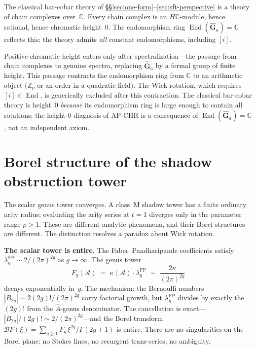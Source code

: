 \documentclass[11pt]{article}
\newcommand{\cA}{\mathcal{A}}
\newcommand{\C}{\mathbb{C}}
\newcommand{\Z}{\mathbb{Z}}
\newcommand{\End}{\operatorname{End}}
\begin{document}
\begin{observation}
\label{obs:wick-rational}
The classical bar-cobar theory of
\S\S\ref{sec:one-form}--\ref{sec:sft-perspective} is a theory of
chain complexes over~$\C$.  Every chain complex is an
$H\C$-module, hence rational, hence chromatic height~$0$.  The
endomorphism ring $\End(\hat{\mathbf{G}}_a) = \C$ reflects this:
the theory admits \emph{all} constant endomorphisms, including
$[i]$.

Positive chromatic height enters only after spectralization---the
passage from chain complexes to genuine spectra, replacing
$\hat{\mathbf{G}}_a$ by a formal group of finite height.  This
passage contracts the endomorphism ring from $\C$ to an arithmetic
object ($\Z_p$ or an order in a quadratic field).  The Wick
rotation, which requires $[i] \in \End$, is generically excluded
after this contraction.  The classical bar-cobar theory is
height~$0$ \emph{because} its endomorphism ring is large enough to
contain all rotations; the height-$0$ diagnosis of AP-CHR is a
consequence of $\End(\hat{\mathbf{G}}_a) = \C$, not an independent
axiom.
\end{observation}

\section{Borel structure of the shadow obstruction tower}
\label{sec:borel-structure-shadow}

The scalar genus tower converges.  A class~M shadow tower has a
finite ordinary arity radius; evaluating the arity series at
$t=1$ diverges only in the parameter range $\rho>1$.  These are
different analytic phenomena, and their Borel structures are
different.  The distinction resolves a paradox about Wick rotation.

\medskip
\noindent\textbf{The scalar tower is entire.}\enspace
The Faber--Pandharipande coefficients satisfy
$\lambda_g^{\mathrm{FP}} \sim 2/(2\pi)^{2g}$ as
$g \to \infty$.  The genus tower
\[
F_g(\cA) \;=\; \kappa(\cA) \cdot \lambda_g^{\mathrm{FP}}
\;\sim\; \frac{2\kappa}{(2\pi)^{2g}}
\]
decays exponentially in~$g$.  The mechanism: the Bernoulli
numbers $|B_{2g}| \sim 2(2g)!/(2\pi)^{2g}$ carry factorial
growth, but $\lambda_g^{\mathrm{FP}}$ divides by exactly the
$(2g)!$ from the $\hat{A}$-genus denominator.  The
cancellation is exact---$|B_{2g}|/(2g)! \sim 2/(2\pi)^{2g}$---and
the Borel transform $\mathcal{B}F(\xi) = \sum_{g \geq 1}
F_g\,\xi^{2g}/\Gamma(2g+1)$ is entire.  There are no
singularities on the Borel plane: no Stokes lines, no
resurgent trans-series, no ambiguity.
\end{document}
